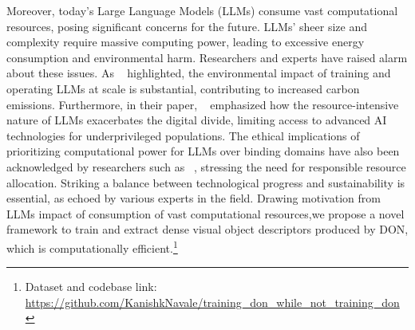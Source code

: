 Moreover, today's Large Language Models (LLMs) consume vast computational resources, posing significant concerns for the future.
LLMs' sheer size and complexity require massive computing power, leading to excessive energy consumption and environmental harm.
Researchers and experts have raised alarm about these issues. As ~\cite{bender2021dangers} highlighted, the environmental impact of training and operating LLMs at scale is substantial, contributing to increased carbon emissions.
Furthermore, in their paper, \citeauthor{strubell2019energy}~\cite{strubell2019energy} emphasized how the resource-intensive nature of LLMs exacerbates the digital divide, limiting access to advanced AI technologies for underprivileged populations. 
The ethical implications of prioritizing computational power for LLMs over binding domains have also been acknowledged by researchers such as \citeauthor{amodei2016concrete}~\cite{amodei2016concrete}, stressing the need for responsible resource allocation. Striking a balance between technological progress and sustainability is essential, as echoed by various experts in the field. 
Drawing motivation from LLMs impact of consumption of vast computational resources,we propose a novel framework to train and extract dense visual object descriptors produced by DON, which is computationally efficient.\footnote{Dataset and codebase link: \url{https://github.com/KanishkNavale/training_don_while_not_training_don}}